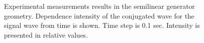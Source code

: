\begin{figure}
\centering

\caption{Experimental measurements results in the
  semilinear generator geometry. Dependence intensity of the conjugated wave
  for the signal wave from time is
  shown. Time step is 0.1 sec. Intensity is presented in relative values.
}
\label{figExp}
\end{figure}
